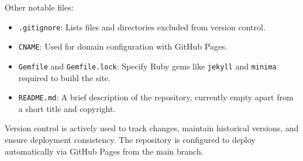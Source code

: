 Other notable files:
\begin{itemize}
	\item \verb|.gitignore|: Lists files and directories excluded from version control.
	\item \verb|CNAME|: Used for domain configuration with GitHub Pages.
	\item \verb|Gemfile| and \verb|Gemfile.lock|: Specify Ruby gems like \verb|jekyll| and \verb|minima| required to build the site.
	\item \verb|README.md|: A brief description of the repository, currently empty apart from a short title and copyright.
\end{itemize}

Version control is actively used to track changes, maintain historical versions, and ensure deployment consistency. The repository is configured to deploy automatically via GitHub Pages from the main branch.\par